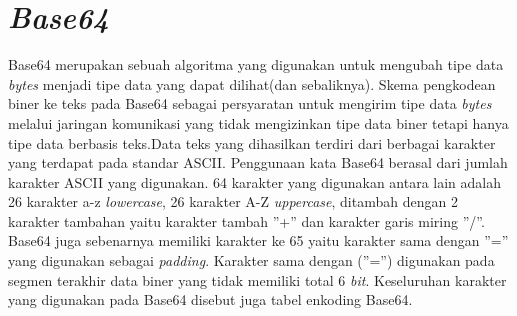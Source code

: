 

\section{\textit{Base64}}
\label{sec:base64}

Base64 merupakan sebuah algoritma yang digunakan untuk mengubah tipe data \textit{bytes} menjadi tipe data yang dapat dilihat(dan sebaliknya). Skema pengkodean biner ke teks pada Base64 sebagai persyaratan untuk mengirim tipe data \textit{bytes} melalui jaringan komunikasi yang tidak mengizinkan tipe data biner tetapi hanya tipe data berbasis teks.Data teks yang dihasilkan terdiri dari berbagai karakter yang terdapat pada standar ASCII. Penggunaan kata Base64 berasal dari jumlah karakter ASCII yang digunakan. 64 karakter yang digunakan antara lain adalah 26 karakter a-z \textit{lowercase}, 26 karakter A-Z \textit{uppercase}, ditambah dengan 2 karakter tambahan yaitu karakter tambah ”+” dan karakter garis miring ”/”. Base64 juga sebenarnya memiliki karakter ke 65 yaitu karakter sama dengan ”=” yang digunakan sebagai \textit{padding}. Karakter sama dengan (”=”) digunakan pada segmen terakhir data biner yang tidak memiliki total 6 \textit{bit}. Keseluruhan karakter yang digunakan pada Base64 disebut juga tabel enkoding Base64.

